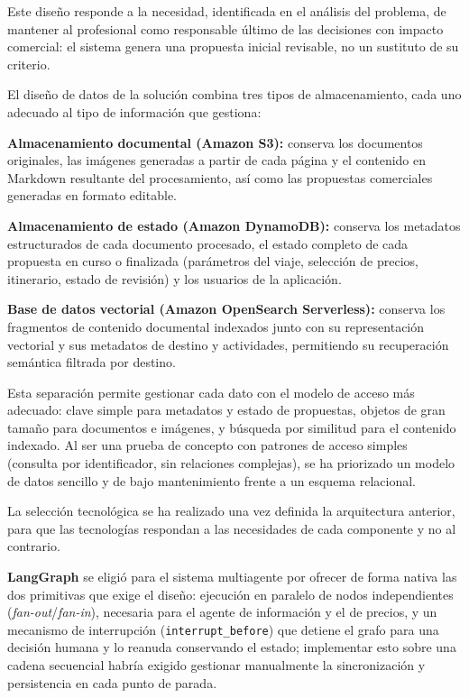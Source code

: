 Este diseño responde a la necesidad, identificada en el análisis del problema, de mantener al profesional como responsable último de las decisiones con impacto comercial: el sistema genera una propuesta inicial revisable, no un sustituto de su criterio.

El diseño de datos de la solución combina tres tipos de almacenamiento, cada uno adecuado al tipo de información que gestiona:

\begin{tfmbullets}
\item \textbf{Almacenamiento documental (Amazon S3):} conserva los documentos originales, las imágenes generadas a partir de cada página y el contenido en Markdown resultante del procesamiento, así como las propuestas comerciales generadas en formato editable.
\item \textbf{Almacenamiento de estado (Amazon DynamoDB):} conserva los metadatos estructurados de cada documento procesado, el estado completo de cada propuesta en curso o finalizada (parámetros del viaje, selección de precios, itinerario, estado de revisión) y los usuarios de la aplicación.
\item \textbf{Base de datos vectorial (Amazon OpenSearch Serverless):} conserva los fragmentos de contenido documental indexados junto con su representación vectorial y sus metadatos de destino y actividades, permitiendo su recuperación semántica filtrada por destino.
\end{tfmbullets}

Esta separación permite gestionar cada dato con el modelo de acceso más adecuado: clave simple para metadatos y estado de propuestas, objetos de gran tamaño para documentos e imágenes, y búsqueda por similitud para el contenido indexado. Al ser una prueba de concepto con patrones de acceso simples (consulta por identificador, sin relaciones complejas), se ha priorizado un modelo de datos sencillo y de bajo mantenimiento frente a un esquema relacional.

La selección tecnológica se ha realizado una vez definida la arquitectura anterior, para que las tecnologías respondan a las necesidades de cada componente y no al contrario.

\textbf{LangGraph} se eligió para el sistema multiagente por ofrecer de forma nativa las dos primitivas que exige el diseño: ejecución en paralelo de nodos independientes (\textit{fan-out}/\textit{fan-in}), necesaria para el agente de información y el de precios, y un mecanismo de interrupción (\texttt{interrupt\_before}) que detiene el grafo para una decisión humana y lo reanuda conservando el estado; implementar esto sobre una cadena secuencial habría exigido gestionar manualmente la sincronización y persistencia en cada punto de parada.


